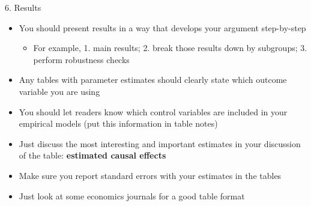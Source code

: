 \documentclass[dvipsnames,hyperref={pdfpagelabels=false}]{beamer}
\begin{document}
\begin{frame}{6. Results}
	\begin{itemize} 
		
		\item You should present results in a way that develops your argument step-by-step
		\vspace{0.1cm}
		\begin{itemize} 
			\item For example, 1. main results; 2. break those results down by subgroups; 3. perform robustness checks
		\end{itemize}
		\vspace{0.1cm} 
		\item Any tables with parameter estimates should clearly state which outcome variable you are using
		\vspace{0.1cm}
		\item You should let readers know which control variables are included in your empirical models (put this information in table notes)
		\vspace{0.1cm}
		\item Just discuss the most interesting and important
		estimates in your discussion of the table: \textbf{estimated causal effects}
		\vspace{0.1cm}
		\item Make sure you report standard errors with your estimates in the tables
		\vspace{0.1cm}
		\item Just look at some economics journals for a good table
		format
		
	\end{itemize}
	
\end{frame}
\end{document}
